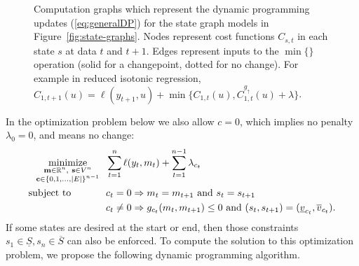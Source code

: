 \documentclass[article]{jss}
\DeclareMathOperator*{\minimize}{minimize}
\newcommand{\RR}{\mathbb R}
\begin{document}
\begin{figure}[H]
{
}
\caption{Computation graphs which represent the dynamic programming
  updates (\ref{eq:generalDP}) for the state graph models in
  Figure~\ref{fig:state-graphs}. Nodes represent cost functions
  $C_{s,t}$ in each state $s$ at data $t$ and $t+1$. Edges represent
  inputs to the $\min\{\}$ operation (solid for a changepoint, dotted
  for no change). For example in reduced isotonic regression, $C_{1,t+1}(u) = \ell(y_{t+1}, u) + \min\{ C_{1,t}(u), C_{1,t}^{g_{\uparrow}}(u) + \lambda \}$.
}
  \label{fig:computation-graphs}
\end{figure}

In the optimization problem below we
also allow $c=0$, which implies no penalty $\lambda_0=0$, and means no
change:
\begin{align}
  \label{eq:GFPOP_problem}
  \minimize_{
    \substack{
    \mathbf m\in\RR^n,\ \mathbf s\in V^n\\
\mathbf c\in \{0,1,\dots,|E|\}^{n-1}
}
    } &\ \ 
  \sum_{t=1}^n \ell(y_t, m_t) + \sum_{t=1}^{n-1} \lambda_{c_t} \\
  \text{subject to \hskip 0.9cm} &\ \ c_t = 0 \Rightarrow m_t = m_{t+1}
\text{ and } s_t= s_{t+1}
  \nonumber\\
&\ \ c_t \neq 0 \Rightarrow g_{c_t}(m_t, m_{t+1})\leq 0\text{ and }
(s_t,s_{t+1})=(\underline v_{c_t}, \overline v_{c_t}).
\nonumber
\end{align}
If some states are desired at the start or end, then those constraints
$s_1\in \underline S, s_n\in\overline S$ can also be enforced.  To
compute the solution to this optimization problem, we propose the
following dynamic programming algorithm.
\end{document}

